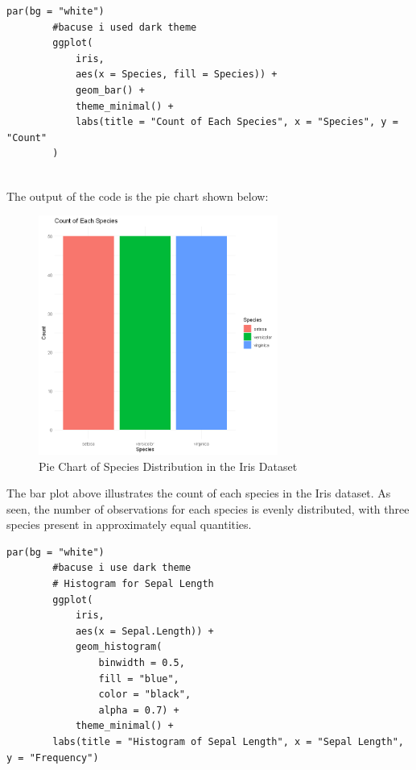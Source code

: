 \documentclass[a4paper,12pt]{article}
\begin{document}
    \begin{lstlisting}[style=RStyle]
        par(bg = "white")                          
        #bacuse i used dark theme
        ggplot(
            iris,
            aes(x = Species, fill = Species)) +
            geom_bar() +
            theme_minimal() +
            labs(title = "Count of Each Species", x = "Species", y = "Count"
        )
        
    \end{lstlisting}
        
    The output of the code is the pie chart shown below:
    
    \begin{figure}[h]
        \includegraphics[width=0.7\textwidth]{02.png}
        \caption{Pie Chart of Species Distribution in the Iris Dataset}
        \label{fig:pie_chart}
    \end{figure}
    The bar plot above illustrates the count of each species in the Iris dataset. As seen, the number of observations for each species is evenly distributed, with three species present in approximately equal quantities.

    \newpage

    \begin{lstlisting}[style=RStyle]
        par(bg = "white")                          
        #bacuse i use dark theme
        # Histogram for Sepal Length
        ggplot(
            iris,
            aes(x = Sepal.Length)) +
            geom_histogram(
                binwidth = 0.5,
                fill = "blue",
                color = "black",
                alpha = 0.7) +
            theme_minimal() +
        labs(title = "Histogram of Sepal Length", x = "Sepal Length", y = "Frequency")
        
    \end{lstlisting}
        
\end{document}
